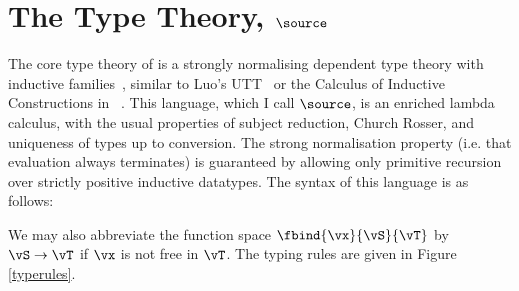 \section{The Type Theory, $\source$}

The core type theory of \Ivor{} is a strongly normalising dependent
type theory with inductive families~\cite{dybjer94}, similar to Luo's
UTT~\cite{luo94} or the Calculus of Inductive Constructions in
\Coq{}~\cite{coq-manual}. This language, which I call $\source$, is an
enriched lambda calculus, with the usual properties of subject
reduction, Church Rosser, and uniqueness of types up to
conversion. The strong normalisation property (i.e. that evaluation
always terminates) is guaranteed by allowing only primitive recursion
over strictly positive inductive datatypes. The syntax of this
language is as follows:


We may also abbreviate the function space $\fbind{\vx}{\vS}{\vT}$ by
$\vS\to\vT$ if $\vx$ is not free in $\vT$. The typing rules are given
in Figure \ref{typerules}.

